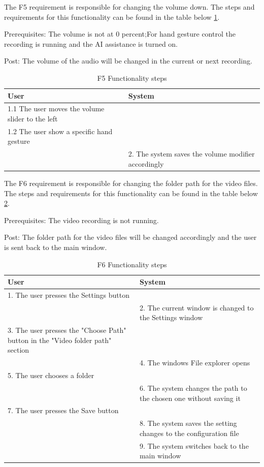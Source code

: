 \par The F5 requirement is responsible for changing the volume down. The steps and requirements for this functionality can be found in the table below \ref{F5Table}.
\par Prerequisites: The volume is not at 0 percent;For hand gesture control the recording is running and the AI assistance is turned on.
\par Post: The volume of the audio will be changed in the current or next recording.

\begin{table}[htbp]
\begin{center}
\begin{tabular}
{|p{180pt}|p{180pt}|}
\hline
 User & System\\
\hline 
\hline 1.1 The user moves the volume slider to the left &  \\
\hline 1.2 The user show a specific hand gesture &  \\
\hline  & 2. The system saves the volume modifier accordingly \\
\hline
\end{tabular}
\end{center}
\caption{F5 Functionality steps}
\label{F5Table}
\end{table}

\par The F6 requirement is responsible for changing the folder path for the video files. The steps and requirements for this functionality can be found in the table below \ref{F6Table}.
\par Prerequisites: The video recording is not running.
\par Post: The folder path for the video files will be changed accordingly and the user is sent back to the main window.

\begin{table}[htbp]
\begin{center}
\begin{tabular}
{|p{180pt}|p{180pt}|}
\hline
 User & System\\
\hline 
\hline 1. The user presses the Settings button &  \\
\hline  & 2. The current window is changed to the Settings window \\
\hline 3. The user presses the "Choose Path" button in the "Video folder path" section&  \\
\hline  & 4. The windows File explorer opens \\
\hline 5. The user chooses a folder &  \\
\hline  & 6. The system changes the path to the chosen one without saving it \\
\hline 7. The user presses the Save button &  \\
\hline  & 8. The system saves the setting changes to the configuration file \\
\hline  & 9. The system switches back to the main window \\
\hline
\end{tabular}
\end{center}
\caption{F6 Functionality steps}
\label{F6Table}
\end{table}

